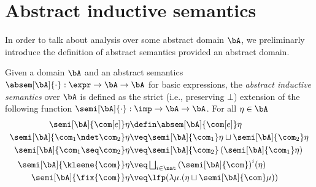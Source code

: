 \section{Abstract inductive semantics}\label{sec:abstractsem}

In order to talk about analysis over some abstract domain \(\bA\), we
preliminarly introduce the definition of abstract semantics provided
an abstract domain.

\begin{definition}\label{def:abstrsem}
  Given a domain \(\bA\) and an abstract semantics
  \(\absem[\bA]{\cdot} : \expr \to \bA \to
  \bA\) for basic expressions, the \emph{abstract inductive
    semantics} over \(\bA\) is defined as the strict (i.e.,
  preserving \(\bot\)) extension of the following function
  \({\semi[\bA]{\cdot} : \imp \to \bA \to
    \bA}\). For all \(\eta \in \bA\)
  \begin{align*}
    \semi[\bA]{\com[e]}\eta & \defin \absem[ \bA]{\com[e]}\eta\\
    \semi[\bA]{\com_1 \ndet \com_2} \eta
    & \veq \semi[\bA]{\com_1} \eta \sqcup \semi[\bA]{\com_2} \eta\\
    \semi[\bA]{\com_1 \seq \com_2} \eta
    & \veq \semi[\bA]{\com_2} \left(\semi[\bA]{\com_1} \eta\right)\\
    \semi[\bA]{\kleene{\com}} \eta
    & \veq \textstyle \bigsqcup_{i \in \nat} {\left(\semi[\bA]{\com}\right)}^i (\eta)\\
    \semi[\bA]{\fix{\com}} \eta
    & \veq  \lfp(\lambda \mu. (\eta \sqcup \semi[\bA]{\com} \mu))
  \end{align*}
\end{definition}

